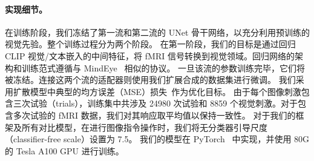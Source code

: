\paragraph{实现细节。} 在训练阶段，我们冻结了第一流和第二流的 UNet 骨干网络，以充分利用预训练的视觉先验。整个训练过程分为两个阶段。
在第一阶段，我们的目标是通过回归 CLIP 视觉/文本嵌入的中间特征，将 fMRI 信号转换到视觉领域。回归网络的架构和训练范式遵循与 MindEye~\cite{scotti2023reconstructing} 相似的协议。
一旦该流的参数训练完毕，它们将被冻结。连接这两个流的适配器则使用我们扩展合成的数据集进行微调。
我们采用扩散模型中典型的均方误差（MSE）损失~\cite{ho2020denoising}作为优化目标。
由于每个图像刺激包含三次试验（trials），训练集中共涉及 24980 次试验和 8859 个视觉刺激。对于包含多次试验的 fMRI 数据，我们对其响应取平均值以保持一致性。
对于我们的框架及所有对比模型，在进行图像指令操作时，我们将无分类器引导尺度（classifier-free scale）设置为 7.5。
我们的模型在 PyTorch~\cite{paszke2019pytorch} 中实现，并使用 80G 的 Tesla A100 GPU 进行训练。

